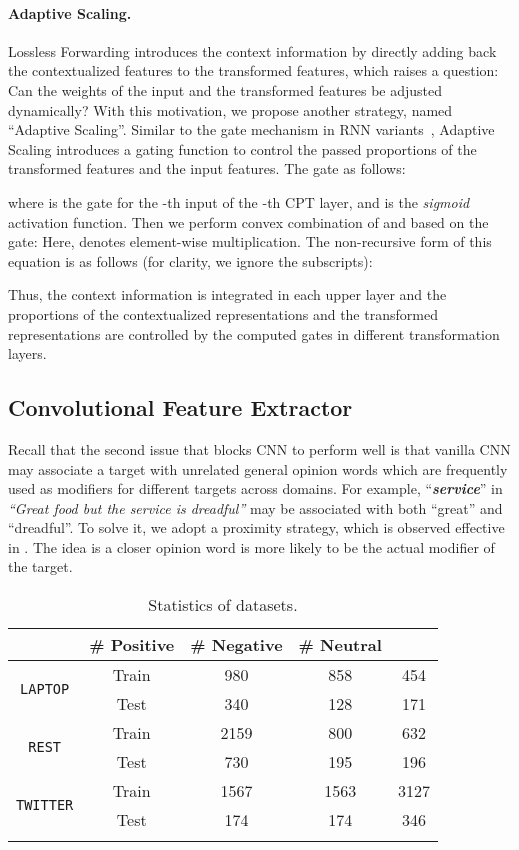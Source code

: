 \documentclass[11pt,a4paper]{article}
\begin{document}
\paragraph{Adaptive Scaling.}
Lossless Forwarding introduces the context information by directly adding back the contextualized features to the transformed features, which raises a question: Can the weights of the input and the transformed features be adjusted dynamically? With this motivation, we propose another strategy, named ``Adaptive Scaling''. Similar to the gate mechanism in RNN variants~\cite{jozefowicz2015empirical}, Adaptive Scaling introduces a gating function to control the passed proportions of the transformed features and the input features. The gate  as follows:

where  is the gate for the -th input of the -th CPT layer, and  is the \textit{sigmoid} activation function. Then we perform convex combination of  and  based on the gate: 
Here,  denotes element-wise multiplication. The non-recursive form of this equation is as follows (for clarity, we ignore the subscripts):


Thus, the context information is integrated in each upper layer and the proportions of the contextualized representations and the transformed representations are controlled by the computed gates in different transformation layers.

\subsection{Convolutional Feature Extractor}
Recall that the second issue that blocks CNN to perform well is that vanilla CNN may associate a target with unrelated general opinion words which are frequently used as modifiers for different targets across domains. For example, ``\textit{\textbf{service}}'' in \textit{``Great food but the service is dreadful''} may be associated with both ``great'' and ``dreadful''. To solve it, we adopt a proximity strategy, which is observed effective in \cite{chen-EtAl:2017:EMNLP20171,li2017deep}. The idea is a closer opinion word is more likely to be the actual modifier of the target. 



\begin{table}[t!]
\centering
\resizebox{0.48\textwidth}{!}
{\begin{tabular}{ccccc}
\Xhline{3\arrayrulewidth}
 \multicolumn{2}{c}{} & \# Positive & \# Negative & \# Neutral \\ \hline
\multirow{2}{*}{\texttt{LAPTOP}} & Train & 980 & 858 & 454 \\ & Test & 340 & 128 & 171 \\ \hline
\multirow{2}{*}{\texttt{REST}} & Train & 2159 & 800 & 632\\ & Test & 730 & 195 & 196\\ \hline
\multirow{2}{*}{\texttt{TWITTER}} & Train & 1567 & 1563 & 3127\\ & Test & 174 & 174 & 346 \\ \Xhline{3\arrayrulewidth}
\end{tabular}}
\caption{Statistics of datasets.}
\label{tab:statistics}
\end{table}
\end{document}
